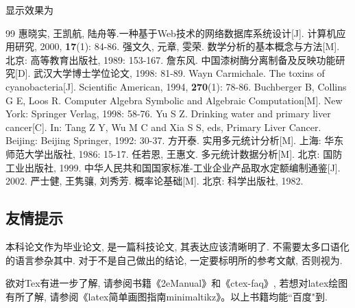 \documentclass[a4paper,12pt,twoside]{ctexart}
\begin{document}
    \vspace*{-25pt}
    \noindent 显示效果为

    \begin{thebibliography}{99}\setlength{\itemsep}{-.75ex}
     惠晓实, 王凯航, 陆舟等.一种基于Web技术的网络数据库系统设计[J]. 计算机应用研究, 2000, \textbf{17}(1): 84-86.
    强文久, 元章, 雯荣. 数学分析的基本概念与方法[M]. 北京: 高等教育出版社, 1989: 153-167.
    詹东风. 中国漆树酶分离制备及反映功能研究[D]. 武汉大学博士学位论文, 1998: 81-89.
     Wayn Carmichale. The toxins of cyanobacteria[J]. Scientific American, 1994, \textbf{270}(1): 78-86.
    Buchberger B, Collins G E, Loos R. Computer Algebra Symbolic and Algebraic Computation[M]. New York: Springer Verlag, 1998: 58-76.
    Yu S Z. Drinking water and primary liver cancer[C]. In: Tang Z Y, Wu M C and Xia S S, eds, Primary Liver Cancer. Beijing: Beijing Springer, 1992: 30-37.
    方开泰. 实用多元统计分析[M]. 上海: 华东师范大学出版社, 1986: 15-17.
     任若恩, 王惠文. 多元统计数据分析[M]. 北京: 国防工业出版社, 1999.
     中华人民共和国国家标准-工业企业产品取水定额编制通鉴[J]. 2002.
    严士健, 王隽骧, 刘秀芳. 概率论基础[M]. 北京: 科学出版社, 1982.
    \end{thebibliography}

    \subsection{友情提示}
    本科论文作为毕业论文, 是一篇科技论文, 其表达应该清晰明了. 不需要太多口语化的语言参杂其中. 对于不是自己做出的结论, 一定要标明所的参考文献, 否则视为.

    欲对Tex{}有进一步了解, 请参阅书籍《2eManual》和《ctex-faq》, 若想对latex绘图有所了解, 请参阅《latex简单画图指南minimaltikz》。以上书籍均能``百度"到.
\end{document}
